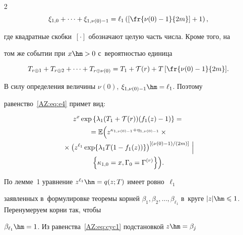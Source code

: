 \begin{multicols}{2}
\begin{equation*}
  \xi_{1,0}+\cdots+\xi_{1,\nu(0)-1}=

  \ell_1\left(\left[\fr{\nu(0)-1}{2m}\right]+1\right),


\end{equation*}

где квадратные скобки~$[\cdot]$ обозначают целую часть числа.  Кроме того, на

том же событии при $x\hm>0$ с~вероятностью единица

\begin{equation*}

T_{r\oplus1}+T_{r\oplus2}+\cdots+T_{r\oplus\nu(0)}=

T_1+ \mathcal T(r) +T\left[\fr{\nu(0)-1}{2m}\right]\!.


\end{equation*}

В силу определения величины $\nu(0)$, $\xi_{1,\nu(0)-1}\hm=\ell_1$. Поэтому

равенство~\eqref{AZ:eq:e4} примет вид:

\begin{multline}

  z^{x}\exp\left\{\lambda_{1}(T_{1}+\mathcal{T}(r))(f_{1}(z)-1)\right\}={}  \\

  {} =

  \mathbb{E}\Bigl( z^{\kappa_{1,\nu(0)-1}+\eta_{1,\nu(0)-1}}\times{}\\

  {}\times 

  \left( z^{\ell_1}\exp\{ \lambda_{1}T(1-f_{1}(z))\}

  \right)^{\left[ (\nu(0)-1)/(2m)\right]}\,\Big|\\

  \left\{\kappa_{1,0}=x,\Gamma_{0}=\Gamma^{(r)}\right\}\Bigr).

  \label{AZ:eq:cyc1}

\end{multline}

По лемме~1 уравнение $z^{\ell_1}\hm=q(z;T)$ имеет ровно~$\ell_1$

заявленных в~формулировке теоремы корней $\beta_1, \beta_2, \ldots,

\beta_{\ell_1}$  в~круге $|z|\hm\leqslant1$. Перенумеруем корни так, чтобы

$\beta_{\ell_1}\hm=1$. Из равенства~\eqref{AZ:eq:cyc1} подстановкой $z\hm=\beta_j$


\end{multicols}
